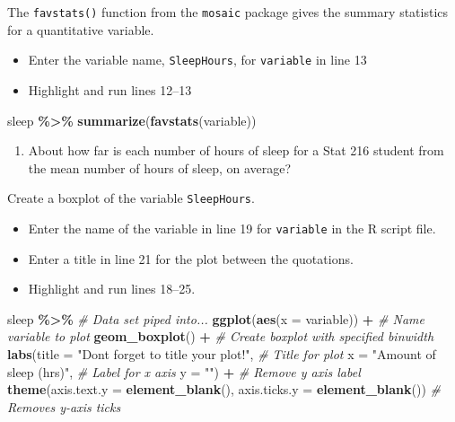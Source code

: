 \documentclass[
]{report}
\newenvironment{Shaded}{\begin{snugshade}}{\end{snugshade}}
\newcommand{\AttributeTok}[1]{\textcolor[rgb]{0.13,0.29,0.53}{#1}}
\newcommand{\CommentTok}[1]{\textcolor[rgb]{0.56,0.35,0.01}{\textit{#1}}}
\newcommand{\FunctionTok}[1]{\textcolor[rgb]{0.13,0.29,0.53}{\textbf{#1}}}
\newcommand{\NormalTok}[1]{#1}
\newcommand{\SpecialCharTok}[1]{\textcolor[rgb]{0.81,0.36,0.00}{\textbf{#1}}}
\newcommand{\StringTok}[1]{\textcolor[rgb]{0.31,0.60,0.02}{#1}}
\providecommand{\tightlist}{%
  \setlength{\itemsep}{0pt}\setlength{\parskip}{0pt}}
\begin{document}
The \texttt{favstats()} function from the \texttt{mosaic} package gives the summary statistics for a quantitative variable.

\begin{itemize}
\item
  Enter the variable name, \texttt{SleepHours}, for \texttt{variable} in line 13
\item
  Highlight and run lines 12--13
\end{itemize}

\begin{Shaded}
\begin{Highlighting}[]
\NormalTok{sleep }\SpecialCharTok{\%\textgreater{}\%}
    \FunctionTok{summarize}\NormalTok{(}\FunctionTok{favstats}\NormalTok{(variable))}
\end{Highlighting}
\end{Shaded}

\begin{enumerate}
\def\labelenumi{\arabic{enumi}.}
\setcounter{enumi}{3}
\tightlist
\item
  About how far is each number of hours of sleep for a Stat 216 student from the mean number of hours of sleep, on average?
\end{enumerate}

\vspace{0.3in}

Create a boxplot of the variable \texttt{SleepHours}.

\begin{itemize}
\item
  Enter the name of the variable in line 19 for \texttt{variable} in the R script file.
\item
  Enter a title in line 21 for the plot between the quotations.
\item
  Highlight and run lines 18--25.
\end{itemize}

\begin{Shaded}
\begin{Highlighting}[]
\NormalTok{sleep }\SpecialCharTok{\%\textgreater{}\%} \CommentTok{\# Data set piped into...}
    \FunctionTok{ggplot}\NormalTok{(}\FunctionTok{aes}\NormalTok{(}\AttributeTok{x =}\NormalTok{ variable)) }\SpecialCharTok{+}   \CommentTok{\# Name variable to plot}
    \FunctionTok{geom\_boxplot}\NormalTok{() }\SpecialCharTok{+}  \CommentTok{\# Create boxplot with specified binwidth}
    \FunctionTok{labs}\NormalTok{(}\AttributeTok{title =} \StringTok{"Don\textquotesingle{}t forget to title your plot!"}\NormalTok{, }\CommentTok{\# Title for plot}
       \AttributeTok{x =} \StringTok{"Amount of sleep (hrs)"}\NormalTok{, }\CommentTok{\# Label for x axis}
       \AttributeTok{y =} \StringTok{""}\NormalTok{) }\SpecialCharTok{+} \CommentTok{\# Remove y axis label}
    \FunctionTok{theme}\NormalTok{(}\AttributeTok{axis.text.y =} \FunctionTok{element\_blank}\NormalTok{(), }
          \AttributeTok{axis.ticks.y =} \FunctionTok{element\_blank}\NormalTok{()) }\CommentTok{\# Removes y{-}axis ticks}
\end{Highlighting}
\end{Shaded}
\end{document}

